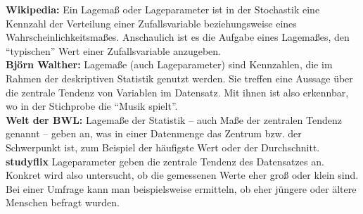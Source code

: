 \begin{kom}
    \textbf{Wikipedia:}  Ein Lagemaß oder Lageparameter ist in der Stochastik eine Kennzahl der Verteilung einer
    Zufallsvariable beziehungsweise
    eines Wahrscheinlichkeitsmaßes.
    Anschaulich ist es die Aufgabe eines Lagemaßes, den ``typischen'' Wert einer Zufallsvariable anzugeben. \\



    \textbf{Björn Walther:} Lagemaße (auch Lageparameter) sind Kennzahlen, die
    im Rahmen der deskriptiven Statistik genutzt werden.
    Sie treffen eine Aussage über die zentrale Tendenz von Variablen im Datensatz.
    Mit ihnen ist also erkennbar, wo in der Stichprobe die ``Musik spielt''. \\


    \textbf{Welt der BWL:} Lagemaße der Statistik – auch Maße der zentralen Tendenz genannt – geben an, was in einer Datenmenge das Zentrum bzw. der Schwerpunkt ist, zum Beispiel der häufigste Wert oder der Durchschnitt.
\\

    \textbf{studyflix} Lageparameter geben die zentrale Tendenz des Datensatzes an.
    Konkret wird also untersucht, ob die gemessenen Werte eher groß oder klein sind.
    Bei einer Umfrage kann man beispielsweise ermitteln, ob eher jüngere oder ältere Menschen befragt wurden.
\end{kom}

